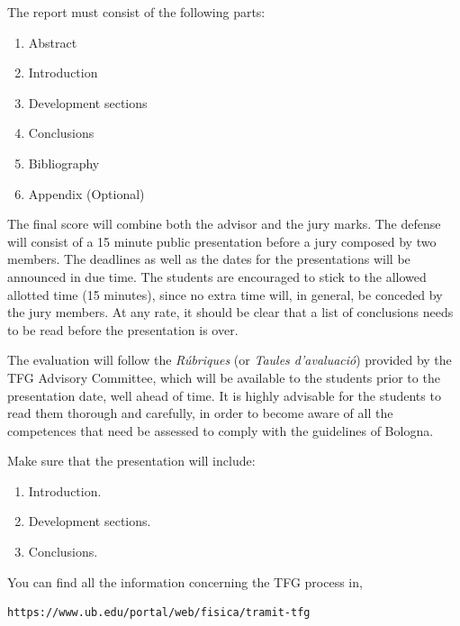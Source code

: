 \documentclass[twocolumn]{revtex4}
\begin{document}
The report must consist of the following parts:
\begin{enumerate}
\item Abstract
\item Introduction
\item Development sections
\item Conclusions
\item Bibliography
\item Appendix (Optional)
\end{enumerate}


The final score will combine both the
advisor and the jury marks.
The defense will consist of a 15 minute public presentation before
a jury composed by two members. The deadlines as well as the dates for the
presentations will be announced in due time.
The students are encouraged to stick to the allowed allotted time (15 minutes),
since no extra time will, in general, be conceded by the jury members.
At any rate,
it should be clear that a list of conclusions needs to be read
before the presentation is over.

The evaluation will follow the {\it R\'ubriques} (or {\it Taules
d'avaluaci\'o}) provided by the TFG Advisory Committee,
which will be available to
the students prior to the presentation date, well ahead of time. It is
highly advisable for the students to read them thorough and carefully,
in order to become aware of all the competences that need be assessed
to comply with the guidelines of Bologna.

Make sure that the presentation will include:
\begin{enumerate}
\item Introduction.
\item Development sections.
\item Conclusions.
\end{enumerate}

You can find all the information concerning the TFG process in,
\begin{verbatim}
https://www.ub.edu/portal/web/fisica/tramit-tfg
\end{verbatim}

\end{document}
